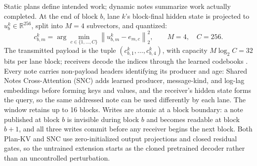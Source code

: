 \documentclass[10pt]{article}
\newcommand{\R}{\mathbb{R}}
\begin{document}
Static plans define intended work; dynamic notes summarize work actually
completed. At the end of block \(b\), lane \(k\)'s block-final hidden state
is projected to \(u^k_b\in\R^{256}\), split into \(M=4\) subvectors, and
quantized:
\begin{equation}
c^k_{b,m}
=\arg\min_{c\in\{1,\ldots,C\}}
\left\|u^k_{b,m}-e_{m,c}\right\|_2^2,
\qquad M=4,\quad C=256.
\end{equation}
The transmitted payload is the tuple
\(
(c^k_{b,1},\ldots,c^k_{b,4})
\),
with capacity \(M\log_2 C=32\) bits per lane block; receivers decode the
indices through the learned codebooks \citep{vandenOord2017vq}. Every note
carries non-payload headers identifying its producer and age: Shared Notes
Cross-Attention (SNC) adds learned producer, message-kind, and log-lag
embeddings before forming keys and values, and the receiver's hidden state
forms the query, so the same addressed note can be used differently by each
lane. The window retains up to 16 blocks. Writes are atomic at a block
boundary: a note published at block \(b\) is invisible during block \(b\) and
becomes readable at block \(b+1\), and all three writes commit before any
receiver begins the next block. Both Plan-KV and SNC use zero-initialized
output projections and closed residual gates, so the untrained extension
starts as the cloned pretrained decoder rather than an uncontrolled
perturbation.
\end{document}
